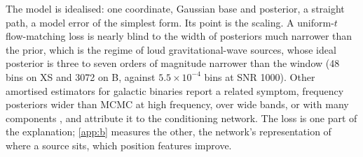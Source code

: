 The model is idealised: one coordinate, Gaussian base and posterior, a straight path, a model
error of the simplest form. Its point is the scaling. A uniform-$t$ flow-matching loss is
nearly blind to the width of posteriors much narrower than the prior, which is the regime of
loud gravitational-wave sources, whose ideal posterior is three to seven orders of magnitude
narrower than the window (48 bins on XS and 3072 on B, against $5.5\times10^{-4}$ bins at SNR
1000). Other amortised estimators for galactic binaries report a related symptom, frequency
posteriors wider than MCMC at high frequency, over wide bands, or with many components
\citep{delmond2026neural,houba2025slotflow}, and attribute it to the conditioning network.
The loss is one part of the explanation; \cref{app:b} measures the other, the network's
representation of where a source sits, which position features improve.
